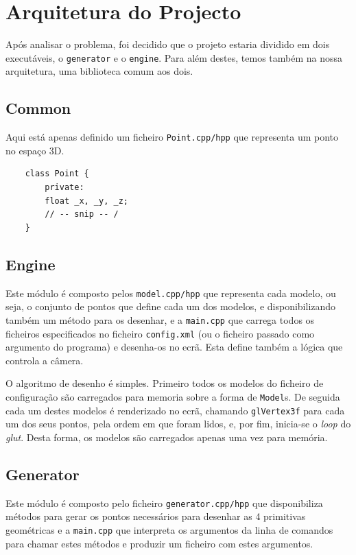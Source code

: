 \documentclass[a4paper]{article}
\begin{document}
\section{Arquitetura do Projecto}
Após analisar o problema, foi decidido que o projeto estaria dividido em dois executáveis, o \texttt{generator} e o \texttt{engine}. Para além destes, temos também na nossa arquitetura, uma biblioteca comum aos dois.

\subsection{Common}

Aqui está apenas definido um ficheiro \texttt{Point.cpp/hpp} que representa um ponto no espaço 3D.

\begin{verbatim}
    class Point {
        private:
        float _x, _y, _z;
        // -- snip -- /
    }
\end{verbatim}

\subsection{Engine}

Este módulo é composto pelos \texttt{model.cpp/hpp} que representa cada modelo, ou seja, o conjunto de pontos que define cada um dos modelos, e disponibilizando também um método para os desenhar, e a \texttt{main.cpp} que carrega todos os ficheiros especificados no ficheiro \texttt{config.xml} (ou o ficheiro passado como argumento do programa) e desenha-os no ecrã. Esta define também a lógica que controla a câmera.

O algoritmo de desenho é simples. Primeiro todos os modelos do ficheiro de configuração são carregados para memoria sobre a forma de \texttt{Model}s. De seguida cada um destes modelos é renderizado no ecrã, chamando \texttt{glVertex3f} para cada um dos seus pontos, pela ordem em que foram lidos, e, por fim, inicia-se o \textit{loop} do \textit{glut}. Desta forma, os modelos são carregados apenas uma vez para memória.

\subsection{Generator}

Este módulo é composto pelo ficheiro \texttt{generator.cpp/hpp} que disponibiliza métodos para gerar os pontos necessários para desenhar as 4 primitivas geométricas e a \texttt{main.cpp} que interpreta os argumentos da linha de comandos para chamar estes métodos e produzir um ficheiro com estes argumentos.
\end{document}
